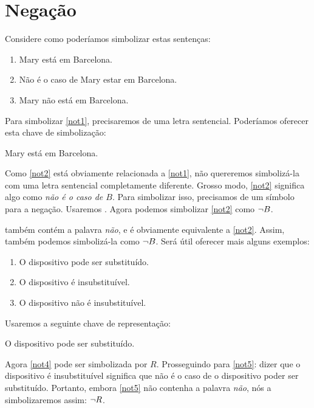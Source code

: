 \section{Negação}

Considere como poderíamos simbolizar estas sentenças:
	\begin{enumerate}
	\item\label{not1} Mary está em Barcelona.
	\item\label{not2} Não é o caso de Mary estar em Barcelona.
	\item\label{not3} Mary não está em Barcelona.
	\end{enumerate}
Para simbolizar \cref*{not1}, precisaremos de uma letra sentencial.
Poderíamos oferecer esta chave de simbolização:
	\begin{ekey}
		\item[B] Mary está em Barcelona.
	\end{ekey}
Como \cref*{not2} está obviamente relacionada a \cref*{not1}, não
quereremos simbolizá-la com uma letra sentencial completamente
diferente. Grosso modo, \cref*{not2} significa algo como
\emph{não é o caso de $B$}. Para simbolizar isso, precisamos de um
símbolo para a negação. Usaremos \enot. Agora podemos simbolizar
\cref*{not2} como $\neg B$.

 também contém a palavra \emph{não}, e é obviamente
equivalente a \cref*{not2}. Assim, também podemos simbolizá-la como
$\neg B$.
Será útil oferecer mais alguns exemplos:
	\begin{enumerate}
		\item\label{not4} O dispositivo pode ser substituído.
		\item\label{not5} O dispositivo é insubstituível.
		\item\label{not5b} O dispositivo não é insubstituível.
	\end{enumerate}
Usaremos a seguinte chave de representação:
	\begin{ekey}
		\item[R] O dispositivo pode ser substituído.
	\end{ekey}
Agora \cref*{not4} pode ser simbolizada por $R$. Prosseguindo para
\cref*{not5}: dizer que o dispositivo é insubstituível significa que não
é o caso de o dispositivo poder ser substituído. Portanto, embora
\cref*{not5} não contenha a palavra \emph{não}, nós a simbolizaremos
assim: $\neg R$.


